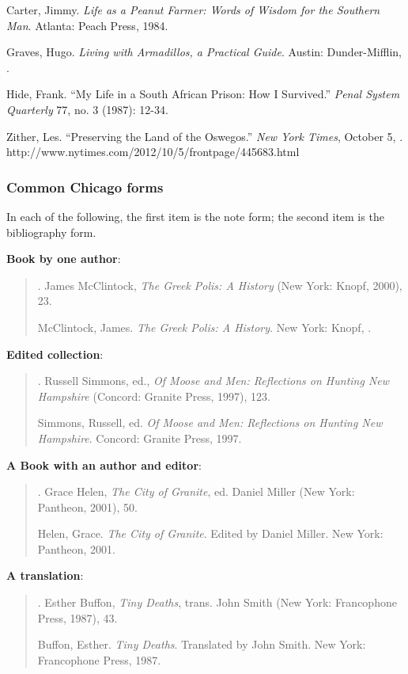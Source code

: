 Carter, Jimmy. \emph{Life as a Peanut Farmer: Words of Wisdom for the Southern Man}. \tab Atlanta: Peach Press, 1984.

Graves, Hugo. \emph{Living with Armadillos, a Practical Guide}. Austin: Dunder-Mifflin, .

Hide, Frank. ``My Life in a South African Prison: How I Survived.'' \emph{Penal System \tab Quarterly} 
77, no. 3 (1987): 12-34.

Zither, Les. ``Preserving the Land of the Oswegos.'' \emph{New York Times}, October 5, . http://www.nytimes.com/2012/10/5/frontpage/445683.html


\newpage




\subsubsection{Common Chicago forms}

In each of the following, the first item is the note form; the second item is the bibliography form.
	 	 	
\textbf{Book by one author}:

\begin{quote}
. James McClintock, \emph{The Greek Polis: A History} (New York: Knopf, 2000), 23.

McClintock, James. \emph{The Greek Polis: A History}. New York: Knopf, .
\end{quote}


\textbf{Edited collection}:
\begin{quote}
. Russell Simmons, ed., \emph{Of Moose and Men: Reflections on Hunting New Hampshire} (Concord: Granite Press, 1997), 123.

Simmons, Russell, ed. \emph{Of Moose and Men: Reflections on Hunting New \tab Hampshire}. Concord: Granite Press, 1997.
\end{quote}

\textbf{A Book with an author and editor}:

\begin{quote}
. Grace Helen, \emph{The City of Granite}, ed. Daniel Miller (New York: Pantheon, 2001), 50.

Helen, Grace. \emph{The City of Granite}. Edited by Daniel Miller. New York: \tab Pantheon, 2001.
\end{quote}

\textbf{A translation}:
\begin{quote}
. Esther Buffon, \emph{Tiny Deaths}, trans. John Smith (New York: Francophone Press, 1987), 43.

Buffon, Esther. \emph{Tiny Deaths}. Translated by John Smith. New York: \tab Francophone Press, 1987.
\end{quote}


